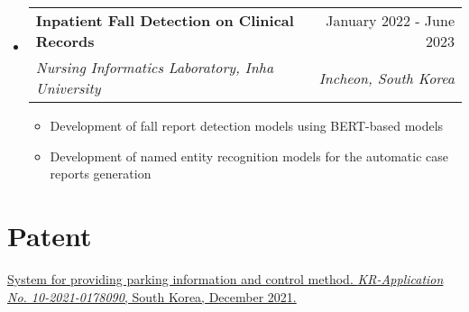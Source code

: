 \documentclass[letterpaper,11pt]{article}
\makeatletter
\newcommand{\resumeSubheading}[4]{
  \vspace{-1pt}\item
    \begin{tabular*}{0.97\textwidth}{l@{\extracolsep{\fill}}r}
      #1 & #2 \\
      \textit{\small#3} & \textit{\small #4} \\
    \end{tabular*}\vspace{-5pt}
}
\makeatother
\begin{document}
\begin{itemize}[leftmargin=*,label=]
        \resumeSubheading
        {\textbf{Inpatient Fall Detection on Clinical Records}}{January 2022 - June 2023}
            {Nursing Informatics Laboratory, Inha University}{Incheon, South Korea}
            \begin{itemize}[label=\bullet]
                \item{Development of fall report detection models using BERT-based models}
                \item{Development of named entity recognition models for the automatic case reports generation}
            \end{itemize}
    \end{itemize}


    \section{Patent}
    \begin{enumerate}[noitemsep, leftmargin=*,label={[\arabic*]}]
        \item{\href{https://doi.org/10.8080/1020210178090}{System for providing parking information and control method. \textit{KR-Application No. 10-2021-0178090}, South Korea, December 2021.}}
    \end{enumerate}
\end{document}

